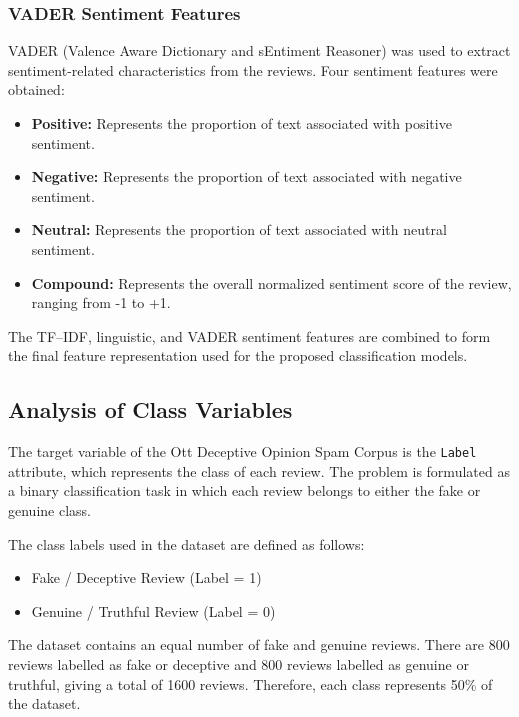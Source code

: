 \documentclass[12pt,a4paper]{report}
\begin{document}
\subsubsection*{VADER Sentiment Features}

VADER (Valence Aware Dictionary and sEntiment Reasoner) was used to extract sentiment-related characteristics from the reviews. Four sentiment features were obtained:

\begin{itemize}
    \item \textbf{Positive:} Represents the proportion of text associated with positive sentiment.
    
    \item \textbf{Negative:} Represents the proportion of text associated with negative sentiment.
    
    \item \textbf{Neutral:} Represents the proportion of text associated with neutral sentiment.
    
    \item \textbf{Compound:} Represents the overall normalized sentiment score of the review, ranging from -1 to +1.
\end{itemize}

The TF--IDF, linguistic, and VADER sentiment features are combined to form the final feature representation used for the proposed classification models.

\subsection{Analysis of Class Variables}

The target variable of the Ott Deceptive Opinion Spam Corpus is the \texttt{Label} attribute, which represents the class of each review. The problem is formulated as a binary classification task in which each review belongs to either the fake or genuine class.

The class labels used in the dataset are defined as follows:

\begin{itemize}
    \item Fake / Deceptive Review (Label = 1)
    \item Genuine / Truthful Review (Label = 0)
\end{itemize}

The dataset contains an equal number of fake and genuine reviews. There are 800 reviews labelled as fake or deceptive and 800 reviews labelled as genuine or truthful, giving a total of 1600 reviews. Therefore, each class represents 50\% of the dataset.
\end{document}
